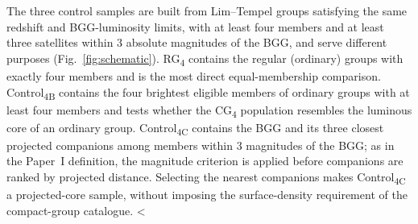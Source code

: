 \documentclass{aa}
\newcommand{\CB}{Control\textsubscript{4B}}
\newcommand{\CC}{Control\textsubscript{4C}}
\newcommand{\CG}{CG\textsubscript{4}}
\newcommand{\RG}{RG\textsubscript{4}}
\newcommand{\kms}{\,\mathrm{km\,s}^{-1}}
\begin{document}
The three control samples are built from Lim--Tempel groups satisfying the same redshift and BGG-luminosity limits, with at least four members and at least three satellites within 3 absolute magnitudes of the BGG, and serve different purposes (Fig.~\ref{fig:schematic}). \RG{} contains the regular (ordinary) groups with exactly four members and is the most direct equal-membership comparison. \CB{} contains the four brightest eligible members of ordinary groups with at least four members and tests whether the \CG{} population resembles the luminous core of an ordinary group. \CC{} contains the BGG and its three closest projected companions among members within 3 magnitudes of the BGG; as in the Paper~I definition, the magnitude criterion is applied before companions are ranked by projected distance. Selecting the nearest companions makes \CC{} a projected-core sample, without imposing the surface-density requirement of the compact-group catalogue. <%
\end{document}
